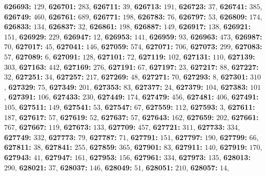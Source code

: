 \textsf{\bfseries 626693:} $129$, \textsf{\bfseries 626701:} $283$, \textsf{\bfseries 626711:} $39$, \textsf{\bfseries 626713:} $191$, \textsf{\bfseries 626723:} $37$, \textsf{\bfseries 626741:} $385$, \textsf{\bfseries 626749:} $460$, \textsf{\bfseries 626761:} $689$, \textsf{\bfseries 626771:} $198$, \textsf{\bfseries 626783:} $76$, \textsf{\bfseries 626797:} $53$, \textsf{\bfseries 626809:} $174$, \textsf{\bfseries 626833:} $134$, \textsf{\bfseries 626837:} $32$, \textsf{\bfseries 626861:} $198$, \textsf{\bfseries 626887:} $149$, \textsf{\bfseries 626917:} $138$, \textsf{\bfseries 626921:} $151$, \textsf{\bfseries 626929:} $229$, \textsf{\bfseries 626947:} $12$, \textsf{\bfseries 626953:} $141$, \textsf{\bfseries 626959:} $93$, \textsf{\bfseries 626963:} $473$, \textsf{\bfseries 626987:} $70$, \textsf{\bfseries 627017:} $45$, \textsf{\bfseries 627041:} $146$, \textsf{\bfseries 627059:} $574$, \textsf{\bfseries 627071:} $706$, \textsf{\bfseries 627073:} $299$, \textsf{\bfseries 627083:} $57$, \textsf{\bfseries 627089:} $6$, \textsf{\bfseries 627091:} $128$, \textsf{\bfseries 627101:} $72$, \textsf{\bfseries 627119:} $102$, \textsf{\bfseries 627131:} $110$, \textsf{\bfseries 627139:} $303$, \textsf{\bfseries 627163:} $442$, \textsf{\bfseries 627169:} $276$, \textsf{\bfseries 627191:} $67$, \textsf{\bfseries 627197:} $23$, \textsf{\bfseries 627217:} $88$, \textsf{\bfseries 627227:} $32$, \textsf{\bfseries 627251:} $34$, \textsf{\bfseries 627257:} $217$, \textsf{\bfseries 627269:} $48$, \textsf{\bfseries 627271:} $70$, \textsf{\bfseries 627293:} $8$, \textsf{\bfseries 627301:} $310$, \textsf{\bfseries 627329:} $75$, \textsf{\bfseries 627349:} $201$, \textsf{\bfseries 627353:} $83$, \textsf{\bfseries 627377:} $24$, \textsf{\bfseries 627379:} $104$, \textsf{\bfseries 627383:} $101$, \textsf{\bfseries 627391:} $106$, \textsf{\bfseries 627433:} $230$, \textsf{\bfseries 627449:} $174$, \textsf{\bfseries 627479:} $456$, \textsf{\bfseries 627481:} $406$, \textsf{\bfseries 627491:} $105$, \textsf{\bfseries 627511:} $149$, \textsf{\bfseries 627541:} $53$, \textsf{\bfseries 627547:} $67$, \textsf{\bfseries 627559:} $112$, \textsf{\bfseries 627593:} $3$, \textsf{\bfseries 627611:} $187$, \textsf{\bfseries 627617:} $57$, \textsf{\bfseries 627619:} $52$, \textsf{\bfseries 627637:} $57$, \textsf{\bfseries 627643:} $162$, \textsf{\bfseries 627659:} $202$, \textsf{\bfseries 627661:} $767$, \textsf{\bfseries 627667:} $119$, \textsf{\bfseries 627673:} $133$, \textsf{\bfseries 627709:} $457$, \textsf{\bfseries 627721:} $311$, \textsf{\bfseries 627733:} $334$, \textsf{\bfseries 627749:} $332$, \textsf{\bfseries 627773:} $79$, \textsf{\bfseries 627787:} $71$, \textsf{\bfseries 627791:} $151$, \textsf{\bfseries 627797:} $190$, \textsf{\bfseries 627799:} $66$, \textsf{\bfseries 627811:} $38$, \textsf{\bfseries 627841:} $255$, \textsf{\bfseries 627859:} $365$, \textsf{\bfseries 627901:} $83$, \textsf{\bfseries 627911:} $140$, \textsf{\bfseries 627919:} $170$, \textsf{\bfseries 627943:} $41$, \textsf{\bfseries 627947:} $161$, \textsf{\bfseries 627953:} $156$, \textsf{\bfseries 627961:} $334$, \textsf{\bfseries 627973:} $135$, \textsf{\bfseries 628013:} $290$, \textsf{\bfseries 628021:} $37$, \textsf{\bfseries 628037:} $146$, \textsf{\bfseries 628049:} $51$, \textsf{\bfseries 628051:} $210$, \textsf{\bfseries 628057:} $14$, 
